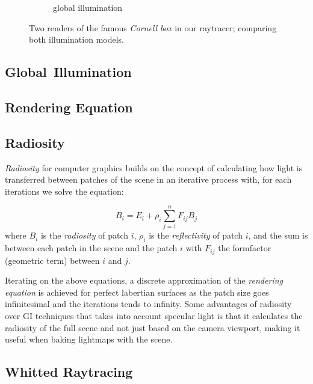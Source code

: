 \documentclass[a4paper, twocolumn]{article}
\begin{document}
\begin{figure}[ht]
\begin{subfigure}{0.48\linewidth}
            \caption{global illumination}
        \end{subfigure}
        \caption{Two renders of the famous \emph{Cornell box} in our raytracer; comparing both illumination models.}
    \end{figure}

    \subsection{Global\, Illumination} \label{sec:global_illumination}

    \subsection{Rendering Equation} \label{sec:rendering_equation}

    \newpage

    \subsection{Radiosity} \label{sec:radiosity}
    
    \textit{Radiosity} for computer graphics builds on the concept of calculating how light is transferred between patches of the scene in an iterative process with, for each iterations we solve the equation:

\begin{equation}
B_i = E_i + \rho_i \sum_{j=1}^{n} F_{ij} B_j
\end{equation}
where \(B_i\) is the \textit{radiosity} of patch \(i\), \(\rho_i\) is the \textit{reflectivity} of patch \(i\), and the sum is between each patch in the scene and the patch \(i\) with \(F_{ij} \) the formfactor (geometric term) between \(i\) and \(j\).

Iterating on the above equations, a discrete approximation of the \textit{rendering equation} is achieved for perfect labertian surfaces as the patch size goes infinitesimal and the iterations tends to infinity. Some advantages of radiosity over GI techniques that takes into account specular light is that it calculates the radiosity of the full scene and not just based on the camera viewport, making it useful when baking lightmaps with the scene.     

    \subsection{Whitted Raytracing} \label{sec:whitted_raytracing}
\end{document}
